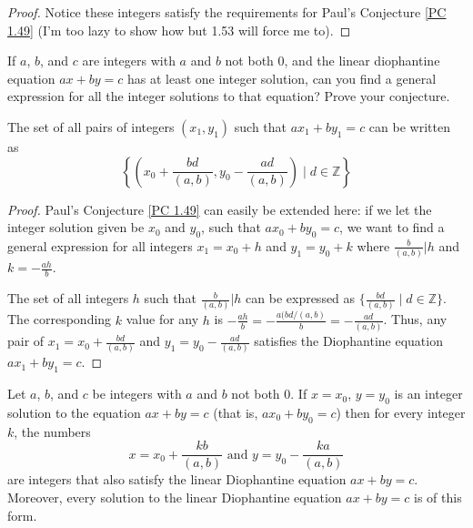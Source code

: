 \documentclass[../main.tex]{subfiles}
\begin{document}
\begin{proof}
  Notice these integers satisfy the requirements for Paul's Conjecture \ref{PC 1.49} (I'm too lazy to show how but 1.53 will force me to).
\end{proof}



\begin{ques} \label{1.52}
  If $a$, $b$, and $c$ are integers with $a$ and $b$ not both $0$, and the linear diophantine equation $ax + by = c$ has at least one integer solution, can you find a general expression for all the integer solutions to that equation? Prove your conjecture.
\end{ques}

\begin{PC} \label{PC 1.52}
  The set of all pairs of integers $(x_1, y_1)$ such that $ax_1 + by_1 = c$ can be written as $$\left\{ \left(x_0 + \frac{bd}{(a,b)}, y_0 - \frac{ad}{(a,b)} \right) \mid d \in \mathbb{Z} \right\}$$
\end{PC}

\begin{proof}
Paul's Conjecture \ref{PC 1.49} can easily be extended here: if we let the integer solution given be $x_0$ and $y_0$, such that $ax_0 + by_0 = c$, we want to find a general expression for all integers $x_1 = x_0 + h$ and $y_1 = y_0 + k$ where $\frac{b}{(a,b)} | h$ and $k = - \frac{ah}{b}$.

The set of all integers $h$ such that $\frac{b}{(a,b)} | h$ can be expressed as $\{\frac{bd}{(a,b)} \mid d \in \mathbb{Z}\}$. The corresponding $k$ value for any $h$ is $- \frac{ah}{b} = - \frac{a (bd / (a,b)}{b} = - \frac{ad}{(a,b)}$.
Thus, any pair of $x_1 = x_0 + \frac{bd}{(a, b)}$ and $y_1 = y_0 - \frac{ad}{(a,b)}$ satisfies the Diophantine equation $ax_1 + by_1 = c$.
\end{proof}



\begin{thm} \label{1.53}
  Let $a$, $b$, and $c$ be integers with $a$ and $b$ not both $0$. If $x = x_0$, $y = y_0$ is an integer solution to the equation $ax + by = c$ (that is, $ax_0 + by_0 = c$) then for every integer $k$, the numbers
  $$x = x_0 + \frac{kb}{(a,b)} \mbox{ and } y = y_0 - \frac{ka}{(a,b)}$$
  are integers that also satisfy the linear Diophantine equation $ax + by = c$. Moreover, every solution to the linear Diophantine equation $ax + by = c$ is of this form.
\end{thm}
\end{document}
